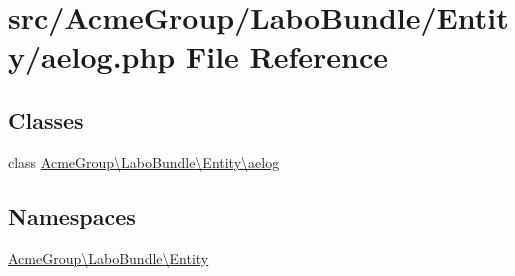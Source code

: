\hypertarget{_labo_bundle_2_entity_2aelog_8php}{\section{src/\+Acme\+Group/\+Labo\+Bundle/\+Entity/aelog.php File Reference}
\label{_labo_bundle_2_entity_2aelog_8php}
}
\subsection*{Classes}
\begin{DoxyCompactItemize}
\item 
class \hyperlink{class_acme_group_1_1_labo_bundle_1_1_entity_1_1aelog}{Acme\+Group\textbackslash{}\+Labo\+Bundle\textbackslash{}\+Entity\textbackslash{}aelog}
\end{DoxyCompactItemize}
\subsection*{Namespaces}
\begin{DoxyCompactItemize}
\item 
 \hyperlink{namespace_acme_group_1_1_labo_bundle_1_1_entity}{Acme\+Group\textbackslash{}\+Labo\+Bundle\textbackslash{}\+Entity}
\end{DoxyCompactItemize}
